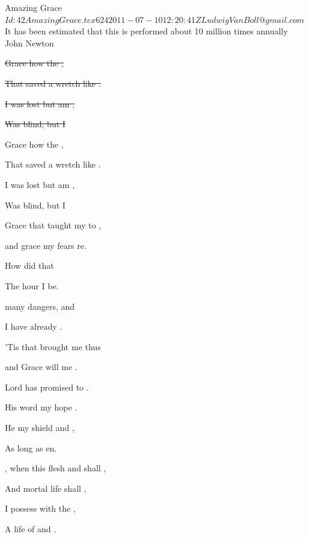 \begin{SBSong}{Amazing Grace}
  {$Id: 42AmazingGrace.tex 624 2011-07-10 12:20:41Z LudwigVanBoll@gmail.com $}
  {It has been estimated that this is performed about 10 million times annually}
  {John Newton}
  \begin{SBVerse}
    \sout{ Grace how  the ,}

    \sout{That saved a wretch like .}
    
    \sout{I  was lost but  am ,}

    \sout{Was blind, but  I }
  \end{SBVerse}
  \begin{SBVerse}
     Grace how  the ,

    That saved a wretch like .
    
    I  was lost but  am ,

    Was blind, but  I 
  \end{SBVerse}
  \begin{SBVerse}
 	 Grace that taught my  to ,

    and grace my fears re.

    How  did that  

    The hour I  be.
  \end{SBVerse}
  \begin{SBVerse}
     many dangers,  and 
    
    I have already .
    
    'Tis  that brought me  thus 
    
    and Grace will  me . 
  \end{SBVerse}
  \begin{SBVerse}
     Lord has promised  to .
    
    His word my hope .
    
    He  my shield and  ,
    
    As long as  en.
  \end{SBVerse}
  \begin{SBVerse}
    , when this flesh and  shall ,

    And mortal life shall ,

    I  possess with the ,

    A life of  and .
  \end{SBVerse}
\end{SBSong}
